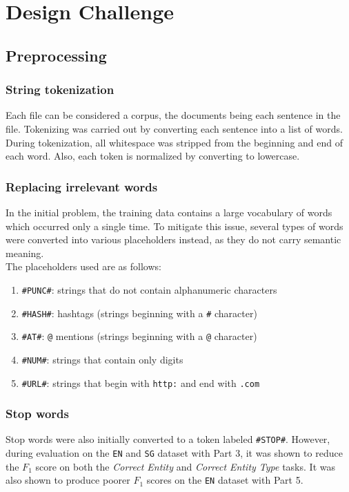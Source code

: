 \documentclass{article}
\numberwithin{equation}{section}
\begin{document}
\newpage

\section{Design Challenge}
\subsection{Preprocessing}
\subsubsection{String tokenization}
Each file can be considered a corpus, the documents being each sentence in the file. Tokenizing was carried out by converting each sentence into a list of words. During tokenization, all whitespace was stripped from the beginning and end of each word. Also, each token is normalized by converting to lowercase.

\subsubsection{Replacing irrelevant words} \label{sec:cleaning}
In the initial problem, the training data contains a large vocabulary of words which occurred only a single time. To mitigate this issue, several types of words were converted into various placeholders instead, as they do not carry semantic meaning. \\

The placeholders used are as follows:
\begin{enumerate}
	\item \lstinline{#PUNC#}: strings that do not contain alphanumeric characters
	\item \lstinline{#HASH#}: hashtags (strings beginning with a \lstinline{#} character)
	\item \lstinline{#AT#}: \lstinline{@} mentions (strings beginning with a \lstinline{@} character)
	\item \lstinline{#NUM#}: strings that contain only digits
	\item \lstinline{#URL#}: strings that begin with \lstinline{http:} and end with \lstinline{.com}
\end{enumerate}

\subsubsection{Stop words}
Stop words were also initially converted to a token labeled \lstinline{#STOP#}. However, during evaluation on the \lstinline{EN} and \lstinline{SG} dataset with Part 3, it was shown to reduce the $F_1$ score on both the \emph{Correct Entity} and \emph{Correct Entity Type} tasks. It was also shown to produce poorer $F_1$ scores on the \lstinline{EN} dataset with Part 5. \\
\end{document}
